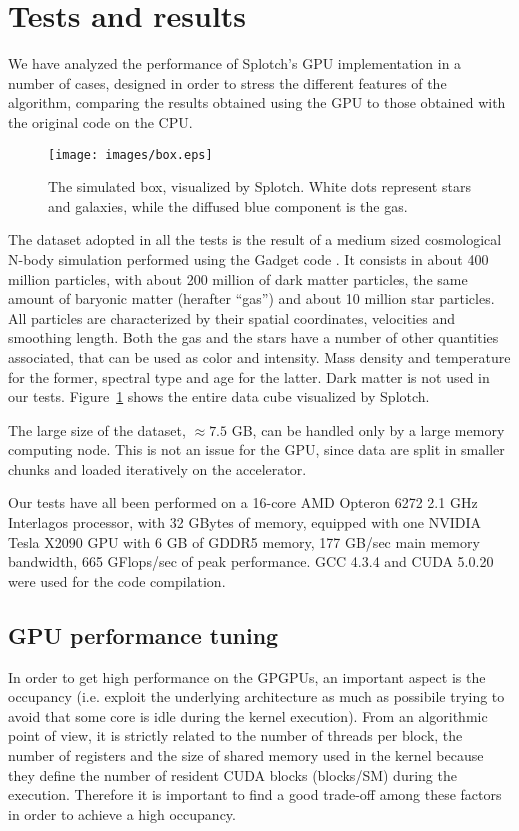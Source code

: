 \documentclass[11pt]{article}
\begin{document}
\section{Tests and results}
\label{sec:results}

We have analyzed the performance of Splotch's GPU implementation in a number of cases, designed in 
order to stress the different features of the algorithm, 
comparing the results 
obtained using the GPU to those obtained with the original code on the CPU. 

\begin{figure}
\centering
\texttt{[image: images/box.eps]}
\caption{The simulated box, visualized by Splotch. White dots represent stars and galaxies, while the 
diffused blue component is the gas.}
\label{fig:box}
\end{figure}

The dataset adopted in all the tests is the result of a medium sized cosmological 
N-body simulation performed using the Gadget code \cite{gadgeturl}. It consists in about 
400 million particles, with about 200 million of dark matter particles, the same amount 
of baryonic matter (herafter ``gas'') and about 10 million star particles. 
All particles are characterized by their spatial coordinates, velocities
and smoothing length. 
Both the gas and the stars have a number of other quantities associated, that can be used 
as color and intensity. Mass density and temperature for the former, spectral type and age
for the latter. Dark matter is not used in our tests. Figure~\ref{fig:box} shows 
the entire data cube visualized by Splotch.

The large size of the dataset, $\approx 7.5$ GB, can be handled only by a large memory computing node. 
This is not an issue for the GPU, since data are split 
in smaller chunks and loaded iteratively on the accelerator. 

Our tests have all been performed on a 16-core AMD Opteron 6272 2.1 GHz Interlagos processor,
with 32 GBytes of memory, equipped with one NVIDIA Tesla X2090 GPU with 6 GB of GDDR5 memory,
177 GB/sec 
main memory bandwidth, 665 GFlops/sec of peak performance. GCC 4.3.4 and CUDA 5.0.20 
were used for the code compilation.

\subsection{GPU performance tuning}
\label{sec:gpuperf}
In order to get high performance on the GPGPUs, an important aspect is the occupancy (i.e. exploit the underlying architecture as much as possibile trying to avoid that some core is idle during the kernel execution).
From an algorithmic point of view, it is strictly related to the number of threads per block, the number of registers and the size of shared memory used in the kernel because they define the number of resident CUDA blocks (blocks/SM) during the execution. 
Therefore it is important to find a good trade-off among these factors in order to achieve a high occupancy. 
\end{document}
